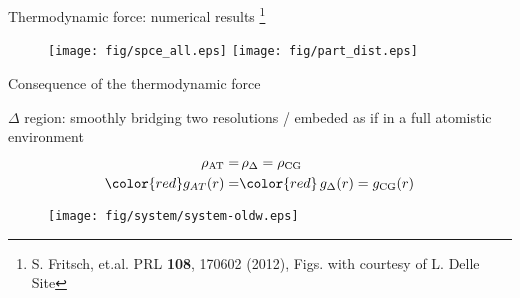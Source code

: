 \documentclass{beamer}
\newcommand{\redc}[1]{{\color{red} #1}}
\newcommand{\bluec}[1]{{\color{blue} #1}}
\newcommand{\vect}[1]{\textbf{\textit{#1}}}
\newcommand{\AT}{{\textrm{{AT}}}}
\newcommand{\CG}{{\textrm{CG}}}
\newcommand{\HY}{{\Delta}}
\begin{document}
\begin{frame}{Thermodynamic force: numerical results
    \footnote{S. Fritsch, et.al. PRL \textbf{108}, 170602 (2012), Figs.
    with courtesy of L. Delle Site}}
  \begin{figure}
    \texttt{[image: fig/spce\_all.eps]}\hfill
    \texttt{[image: fig/part\_dist.eps]}\hfill
  \end{figure}  
\end{frame}


\begin{frame}{Consequence of the thermodynamic force}
    \vfill
\end{frame}


\begin{frame}{$\HY$ region: smoothly bridging two resolutions / embeded as if
  in a full atomistic environment}
  \begin{align*}
    \rho_{\AT} = &\,\rho_{\HY} = \rho_{\CG} \\
    \redc{g_{AT}(r) =} &\redc{\,g_{\HY}(r) = g_{\CG}(r) }
  \end{align*}
  \begin{figure}
    \centering 
    \texttt{[image: fig/system/system-oldw.eps]}
  \end{figure}
\end{frame}
\end{document}
